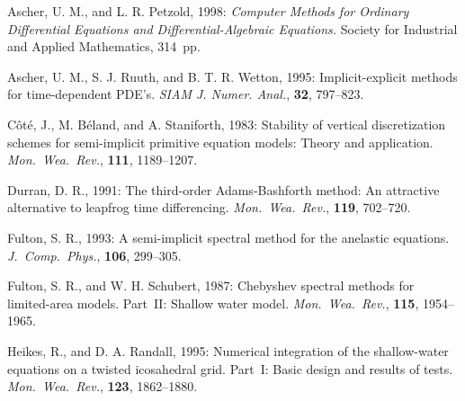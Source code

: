 \documentclass[12pt]{article}
\begin{document}
\pagebreak[4]
\begin{thebibliography}{99}

Ascher, U. M., and L. R. Petzold, 1998:
\textsl{Computer Methods for Ordinary Differential Equations and
Differential-Algebraic Equations.}
Society for Industrial and Applied Mathematics, 314~pp.

Ascher, U. M., S. J. Ruuth, and B. T. R. Wetton, 1995:
Implicit-explicit methods for time-dependent PDE's.
\textsl{SIAM J. Numer. Anal.}, \textbf{32}, 797--823.




C\^{o}t\'{e}, J., M. B\'{e}land, and A. Staniforth, 1983:
Stability of vertical discretization schemes for semi-implicit primitive
equation models:  Theory and application.
\textsl{Mon.\ Wea.\ Rev.}, \textbf{111}, 1189--1207.

Durran, D. R., 1991:
The third-order Adams-Bashforth method:  An attractive alternative to leapfrog
time differencing.
\textsl{Mon.\ Wea.\ Rev.}, \textbf{119}, 702--720.

Fulton, S. R., 1993:
A semi-implicit spectral method for the anelastic equations.
\textsl{J.~Comp.\ Phys.}, \textbf{106}, 299--305.


Fulton, S. R., and W. H. Schubert, 1987:
Chebyshev spectral methods for limited-area models.
Part~II:  Shallow water model.
\textsl{Mon.\ Wea.\ Rev.}, \textbf{115}, 1954--1965.

Heikes, R., and D. A. Randall, 1995:
Numerical integration of the shallow-water equations on a twisted icosahedral
grid.  Part~I:  Basic design and results of tests.
\textsl{Mon.\ Wea.\ Rev.}, \textbf{123}, 1862--1880.


\end{thebibliography}
\end{document}
